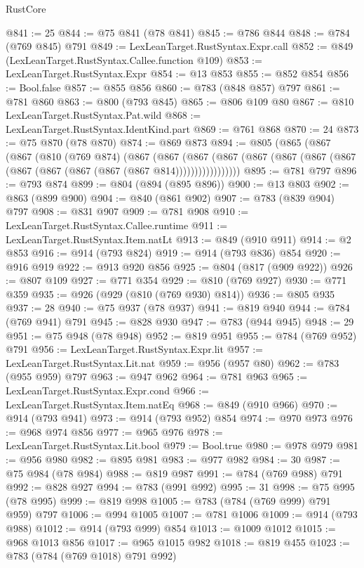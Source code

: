 \begin{lexlean}{RustCore}
\begin{coremodule}
@841 := 25
@844 := @75 @841 (@78 @841)
@845 := @786 @844
@848 := @784 (@769 @845) @791
@849 := LexLeanTarget.RustSyntax.Expr.call
@852 := @849 (LexLeanTarget.RustSyntax.Callee.function @109)
@853 := LexLeanTarget.RustSyntax.Expr
@854 := @13 @853
@855 := @852 @854
@856 := Bool.false
@857 := @855 @856
@860 := @783 (@848 @857) @797
@861 := @781 @860
@863 := @800 (@793 @845)
@865 := @806 @109 @80
@867 := @810 LexLeanTarget.RustSyntax.Pat.wild
@868 := LexLeanTarget.RustSyntax.IdentKind.part
@869 := @761 @868
@870 := 24
@873 := @75 @870 (@78 @870)
@874 := @869 @873
@894 := @805
    (@865
      (@867
        (@867
          (@810
            (@769 @874)
            (@867
              (@867
                (@867
                  (@867 (@867 (@867 (@867 (@867 (@867 (@867 (@867 (@867 (@867 @814)))))))))))))))))
@895 := @781 @797
@896 := @793 @874
@899 := @804 (@894 (@895 @896))
@900 := @13 @803
@902 := @863 (@899 @900)
@904 := @840 (@861 @902)
@907 := @783 (@839 @904) @797
@908 := @831 @907
@909 := @781 @908
@910 := LexLeanTarget.RustSyntax.Callee.runtime
@911 := LexLeanTarget.RustSyntax.Item.natLt
@913 := @849 (@910 @911)
@914 := @2 @853
@916 := @914 (@793 @824)
@919 := @914 (@793 @836) @854
@920 := @916 @919
@922 := @913 @920 @856
@925 := @804 (@817 (@909 @922))
@926 := @807 @109
@927 := @771 @354
@929 := @810 (@769 @927)
@930 := @771 @359
@935 := @926 (@929 (@810 (@769 @930) @814))
@936 := @805 @935
@937 := 28
@940 := @75 @937 (@78 @937)
@941 := @819 @940
@944 := @784 (@769 @941) @791
@945 := @828 @930
@947 := @783 (@944 @945)
@948 := 29
@951 := @75 @948 (@78 @948)
@952 := @819 @951
@955 := @784 (@769 @952) @791
@956 := LexLeanTarget.RustSyntax.Expr.lit
@957 := LexLeanTarget.RustSyntax.Lit.nat
@959 := @956 (@957 @80)
@962 := @783 (@955 @959) @797
@963 := @947 @962
@964 := @781 @963
@965 := LexLeanTarget.RustSyntax.Expr.cond
@966 := LexLeanTarget.RustSyntax.Item.natEq
@968 := @849 (@910 @966)
@970 := @914 (@793 @941)
@973 := @914 (@793 @952) @854
@974 := @970 @973
@976 := @968 @974 @856
@977 := @965 @976
@978 := LexLeanTarget.RustSyntax.Lit.bool
@979 := Bool.true
@980 := @978 @979
@981 := @956 @980
@982 := @895 @981
@983 := @977 @982
@984 := 30
@987 := @75 @984 (@78 @984)
@988 := @819 @987
@991 := @784 (@769 @988) @791
@992 := @828 @927
@994 := @783 (@991 @992)
@995 := 31
@998 := @75 @995 (@78 @995)
@999 := @819 @998
@1005 := @783 (@784 (@769 @999) @791 @959) @797
@1006 := @994 @1005
@1007 := @781 @1006
@1009 := @914 (@793 @988)
@1012 := @914 (@793 @999) @854
@1013 := @1009 @1012
@1015 := @968 @1013 @856
@1017 := @965 @1015 @982
@1018 := @819 @455
@1023 := @783 (@784 (@769 @1018) @791 @992)

\end{coremodule}
\end{lexlean}
